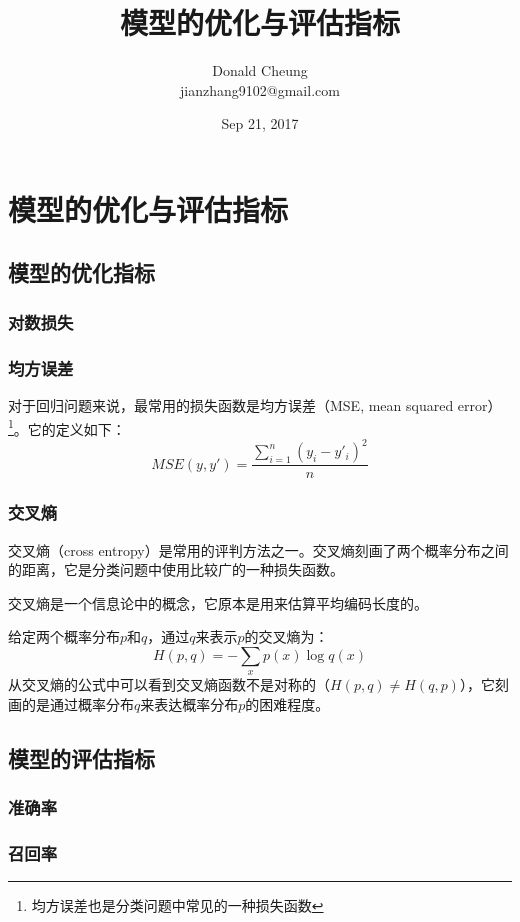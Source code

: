 \documentclass[10pt,a4paper]{ctexbook}
\begin{document}
    \setlength{\baselineskip}{20pt}
    \title{模型的优化与评估指标}
    \author{Donald Cheung\\jianzhang9102@gmail.com}
    \date{Sep 21, 2017}
    \maketitle
    \tableofcontents
\fi

\chapter{模型的优化与评估指标}
\section{模型的优化指标}
\subsection{对数损失}

\subsection{均方误差}
对于回归问题来说，最常用的损失函数是均方误差（MSE, mean squared error）\footnote{均方误差也是分类问题中常见的一种损失函数}。它的定义如下：
\[
MSE(y, y')=\frac{\sum\limits_{i=1}^{n}{(y_{i}-y'_{i})^2}}{n}
\]

\subsection{交叉熵}
交叉熵（cross entropy）是常用的评判方法之一。交叉熵刻画了两个概率分布之间的距离，它是分类问题中使用比较广的一种损失函数。

交叉熵是一个信息论中的概念，它原本是用来估算平均编码长度的。

给定两个概率分布$p$和$q$，通过$q$来表示$p$的交叉熵为：
\[
H(p,q)=-\sum\limits_{x}{p(x)\log{q(x)}}
\]
从交叉熵的公式中可以看到交叉熵函数不是对称的（$H(p,q) \neq H(q,p)$），它刻画的是通过概率分布$q$来表达概率分布$p$的困难程度。




\section{模型的评估指标}
\subsection{准确率}
\subsection{召回率}
\end{document}
